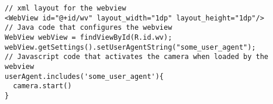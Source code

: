 \begin{lstlisting}[basicstyle=\small\ttfamily,caption={Code snippet that demonstrates how Spy24 streams live video.},label={lst:invisible_browser_code},captionpos=b,float=t]
// xml layout for the webview
<WebView id="@+id/wv" layout_width="1dp" layout_height="1dp"/>
// Java code that configures the webview
WebView webView = findViewById(R.id.wv);
webView.getSettings().setUserAgentString("some_user_agent");
// Javascript code that activates the camera when loaded by the webview
userAgent.includes('some_user_agent'){
  camera.start()
}
\end{lstlisting}





